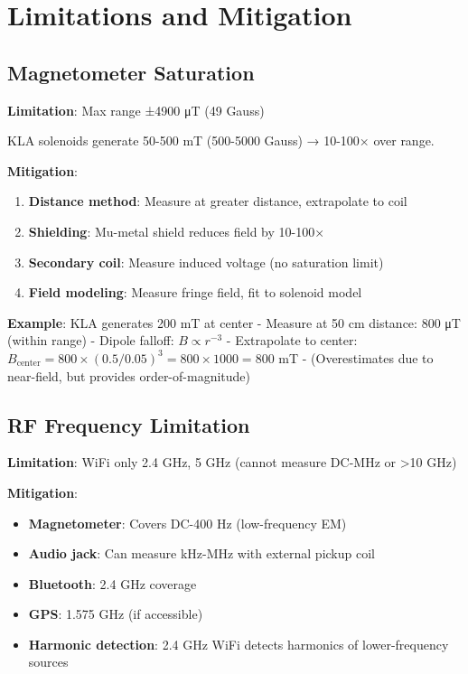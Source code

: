 \documentclass[12pt,a4paper]{article}
\begin{document}
\section{Limitations and Mitigation}

\subsection{Magnetometer Saturation}

\textbf{Limitation}: Max range ±4900 μT (49 Gauss)

KLA solenoids generate 50-500 mT (500-5000 Gauss) → 10-100× over range.

\textbf{Mitigation}:
\begin{enumerate}
\item \textbf{Distance method}: Measure at greater distance, extrapolate to coil
\item \textbf{Shielding}: Mu-metal shield reduces field by 10-100×
\item \textbf{Secondary coil}: Measure induced voltage (no saturation limit)
\item \textbf{Field modeling}: Measure fringe field, fit to solenoid model
\end{enumerate}

\textbf{Example}: KLA generates 200 mT at center
- Measure at 50 cm distance: 800 μT (within range)
- Dipole falloff: $B \propto r^{-3}$
- Extrapolate to center: $B_{\text{center}} = 800 \times (0.5/0.05)^3 = 800 \times 1000 = 800$ mT
- (Overestimates due to near-field, but provides order-of-magnitude)

\subsection{RF Frequency Limitation}

\textbf{Limitation}: WiFi only 2.4 GHz, 5 GHz (cannot measure DC-MHz or >10 GHz)

\textbf{Mitigation}:
\begin{itemize}
\item \textbf{Magnetometer}: Covers DC-400 Hz (low-frequency EM)
\item \textbf{Audio jack}: Can measure kHz-MHz with external pickup coil
\item \textbf{Bluetooth}: 2.4 GHz coverage
\item \textbf{GPS}: 1.575 GHz (if accessible)
\item \textbf{Harmonic detection}: 2.4 GHz WiFi detects harmonics of lower-frequency sources
\end{itemize}
\end{document}
